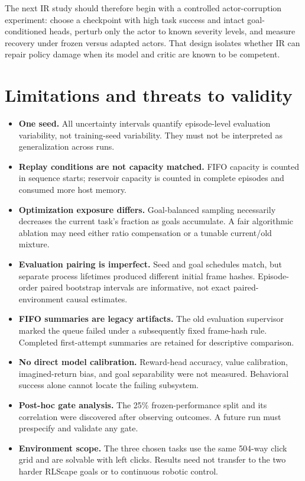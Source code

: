 \documentclass[10pt]{article}
\newcommand{\pct}[1]{#1\%}
\begin{document}
The next IR study should therefore begin with a controlled actor-corruption experiment: choose a checkpoint with high task success and intact goal-conditioned heads, perturb only the actor to known severity levels, and measure recovery under frozen versus adapted actors. That design isolates whether IR can repair policy damage when its model and critic are known to be competent.

\section{Limitations and threats to validity}

\begin{itemize}
  \item \textbf{One seed.} All uncertainty intervals quantify episode-level evaluation variability, not training-seed variability. They must not be interpreted as generalization across runs.
  \item \textbf{Replay conditions are not capacity matched.} FIFO capacity is counted in sequence starts; reservoir capacity is counted in complete episodes and consumed more host memory.
  \item \textbf{Optimization exposure differs.} Goal-balanced sampling necessarily decreases the current task's fraction as goals accumulate. A fair algorithmic ablation may need either ratio compensation or a tunable current/old mixture.
  \item \textbf{Evaluation pairing is imperfect.} Seed and goal schedules match, but separate process lifetimes produced different initial frame hashes. Episode-order paired bootstrap intervals \citep{efron1993bootstrap} are informative, not exact paired-environment causal estimates.
  \item \textbf{FIFO summaries are legacy artifacts.} The old evaluation supervisor marked the queue failed under a subsequently fixed frame-hash rule. Completed first-attempt summaries are retained for descriptive comparison.
  \item \textbf{No direct model calibration.} Reward-head accuracy, value calibration, imagined-return bias, and goal separability were not measured. Behavioral success alone cannot locate the failing subsystem.
  \item \textbf{Post-hoc gate analysis.} The \pct{25} frozen-performance split and its correlation were discovered after observing outcomes. A future run must prespecify and validate any gate.
  \item \textbf{Environment scope.} The three chosen tasks use the same 504-way click grid and are solvable with left clicks. Results need not transfer to the two harder RLScape goals or to continuous robotic control.
\end{itemize}
\end{document}
